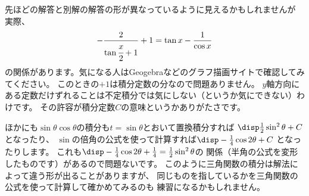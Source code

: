 \documentclass[a4paper]{ltjsarticle}
\numberwithin{equation}{section} %
\begin{document}
\begin{supple*}
  先ほどの解答と別解の解答の形が異なっているように見えるかもしれませんが
  実際、
  \begin{gather*}
    -\frac{2}{{\tan\cfrac{x}{2} + 1}}+1=\tan x - \frac{1}{\cos x}
  \end{gather*}
  の関係があります。気になる人はGeogebraなどのグラフ描画サイトで確認してみてください。
  このときの$+1$は積分定数の分なので問題ありません。
  $y$軸方向にある定数だけずれることは不定積分では気にしない（というか気にできない）わけです。
  その許容が積分定数$C$の意味というかありがたさです。
  \begin{spacing}{1.5}
    ほかにも$\sin\theta\cos\theta$の積分も$t=\sin\theta$とおいて置換積分すれば
    $\disp\frac{1}{2}\sin^2\theta+C$となったり、
    $\sin$の倍角の公式を使って計算すれば$\disp-\frac{1}{4}\cos2\theta+C$
    となったりします。
    これも$\disp -\frac{1}{4}\cos2\theta + \frac{1}{4} = \frac{1}{2}\sin^2\theta$の
    関係（半角の公式を変形したものです）があるので問題ないです。
    このように三角関数の積分は解法によって違う形が出ることがありますが、
    同じものを指しているかを三角関数の公式を使って計算して確かめてみるのも
    練習になるかもしれません。
  \end{spacing}
\end{supple*}

\begin{intprob}
\end{intprob}

\begin{intprob}
\end{intprob}
\end{document}
